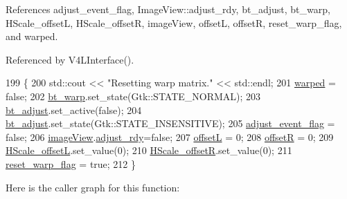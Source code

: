 References adjust\+\_\+event\+\_\+flag, Image\+View\+::adjust\+\_\+rdy, bt\+\_\+adjust, bt\+\_\+warp, H\+Scale\+\_\+offsetL, H\+Scale\+\_\+offsetR, image\+View, offsetL, offsetR, reset\+\_\+warp\+\_\+flag, and warped.



Referenced by V4\+L\+Interface().


\begin{DoxyCode}
199                                                      \{
200         std::cout << \textcolor{stringliteral}{"Resetting warp matrix."} << std::endl;
201         \hyperlink{class_v_s_s_s___g_u_i_1_1_v4_l_interface_ac87d2ec65167aae1177178f6bffce0ed}{warped} = \textcolor{keyword}{false};
202         \hyperlink{class_v_s_s_s___g_u_i_1_1_v4_l_interface_a6cdcc092c26848cd7009e56084ee1b23}{bt\_warp}.set\_state(Gtk::STATE\_NORMAL);
203         \hyperlink{class_v_s_s_s___g_u_i_1_1_v4_l_interface_a0d17ffdc7f7792c2d37bcda12c700133}{bt\_adjust}.set\_active(\textcolor{keyword}{false});
204         \hyperlink{class_v_s_s_s___g_u_i_1_1_v4_l_interface_a0d17ffdc7f7792c2d37bcda12c700133}{bt\_adjust}.set\_state(Gtk::STATE\_INSENSITIVE);
205         \hyperlink{class_v_s_s_s___g_u_i_1_1_v4_l_interface_a52efea2776e5a4c8af47ca2d43dd75a5}{adjust\_event\_flag} = \textcolor{keyword}{false};
206         \hyperlink{class_v_s_s_s___g_u_i_1_1_v4_l_interface_a2c99f4d9fad8a34fa98d5b61beb06745}{imageView}.\hyperlink{class_image_view_a9a73e324dd284f7b6b33b760b9a21c33}{adjust\_rdy}=\textcolor{keyword}{false};
207         \hyperlink{class_v_s_s_s___g_u_i_1_1_v4_l_interface_a4e43fc5295bdec46e8e2fd24bf719e0b}{offsetL} = 0;
208         \hyperlink{class_v_s_s_s___g_u_i_1_1_v4_l_interface_a8bb9caa477b417f549198ea059375f06}{offsetR} = 0;
209         \hyperlink{class_v_s_s_s___g_u_i_1_1_v4_l_interface_a7261b87cb8ad1293c79003c48c99558a}{HScale\_offsetL}.set\_value(0);
210         \hyperlink{class_v_s_s_s___g_u_i_1_1_v4_l_interface_a50fa202e4b9ec95b2c009a324aea10fb}{HScale\_offsetR}.set\_value(0);
211         \hyperlink{class_v_s_s_s___g_u_i_1_1_v4_l_interface_aa6cd5079d1f62050205bca10edf667ce}{reset\_warp\_flag} = \textcolor{keyword}{true};
212     \}
\end{DoxyCode}
Here is the caller graph for this function\+:
\mbox{\label{class_v_s_s_s___g_u_i_1_1_v4_l_interface_a86cbf672edfd408bcac975be8dbacffd}} 
